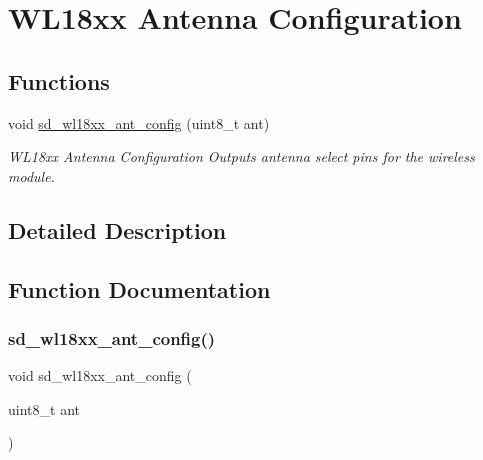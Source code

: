 \hypertarget{group___s_d___platform___w_l18xx___ant}{}\section{W\+L18xx Antenna Configuration}
\label{group___s_d___platform___w_l18xx___ant}
\subsection*{Functions}
\begin{DoxyCompactItemize}
\item 
void \mbox{\hyperlink{group___s_d___platform___w_l18xx___ant_ga3d09a16b4b68ce526bd3eddba77b655c}{sd\+\_\+wl18xx\+\_\+ant\+\_\+config}} (uint8\+\_\+t ant)
\begin{DoxyCompactList}\small\item\em W\+L18xx Antenna Configuration Outputs antenna select pins for the wireless module. \end{DoxyCompactList}\end{DoxyCompactItemize}


\subsection{Detailed Description}


\subsection{Function Documentation}
\mbox{\label{group___s_d___platform___w_l18xx___ant_ga3d09a16b4b68ce526bd3eddba77b655c}} 
\subsubsection{\texorpdfstring{sd\+\_\+wl18xx\+\_\+ant\+\_\+config()}{sd\_wl18xx\_ant\_config()}}
{\footnotesize\ttfamily void sd\+\_\+wl18xx\+\_\+ant\+\_\+config (\begin{DoxyParamCaption}\item[{uint8\+\_\+t}]{ant }\end{DoxyParamCaption})}



